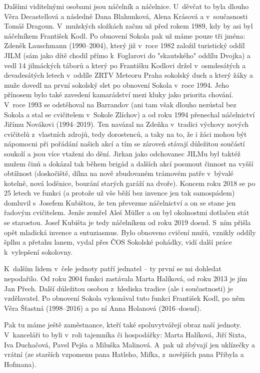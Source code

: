 \documentclass[a5paper, 11pt, twoside]{article}
\begin{document}
{\sloppy Dalšími viditelnými osobami jsou náčelník a náčelnice. U~děvčat to byla dlouho Věra Decastellová a následně Dana Blahunková, Alena Krásová a
v~současnosti Tomáš Dragoun. V~mužských složkách začnu už před rokem 1989,
kdy by asi byl náčelníkem František Kodl. Po obnovení Sokola pak už máme
pouze tři jména: Zdeněk Lauschmann (1990--2004), který již v~roce 1982
založil turistický oddíl JILM (sám jako dítě chodil přímo k~Foglarovi do
"skautského" oddílu Dvojka) a vedl 14 jilmáckých táborů a který po
Františku Kodlovi držel v~osmdesátých a devadesátých letech v~oddíle
ZRTV Meteoru Praha sokolský duch a který žáky a muže dovedl na první
sokolský slet po obnovení Sokola v~roce 1994. Jeho přínosem bylo také
zavedení kamarádství mezi kluky jako priorita chování. V~roce 1993 se
odstěhoval na Barrandov (ani tam však dlouho nezůstal bez Sokola a stal
se cvičitelem v~Sokole Zlíchov) a od roku 1994 přenechal náčelnictví
Jiřímu Novákovi (1994--2019). Ten navázal na Zdeňka
v~tradici výchovy nových cvičitelů z~vlastních zdrojů, tedy dorostenců, a
taky na to, že i žáci mohou být nápomocni při pořádání našich akcí a tím
se zároveň stávají důležitou součástí soukolí a jsou více vtaženi do
dění. Jirkan jako odchovanec JILMu byl taktéž mužem činů a dokázal tak
během brigád a dalších akcí posunout činnost na vyšší obtížnost
(doskočiště, dílna na nově zbudovaném trámovém patře v~bývalé kotelně,
nová loděnice, bourání starých garáží na dvoře). Koncem roku 2018 se po
25 letech ve funkci (a protože už vše běží bez invence jen tak
samospádem) domluvil s~Josefem Kubištou, že ten převezme náčelnictví a
on se stane jen řadovým cvičitelem. Jenže zemřel Aleš Müller a on byl
okolnostmi dotlačen stát se starostou. Josef Kubišta je tedy náčelníkem
od roku 2019 dosud. S~ním přišla opět mladická invence a entuziasmus.
Bylo obnoveno cvičení mužů, vznikly oddíly šplhu a přetahu lanem, vydal
přes ČOS Sokolské pohádky, vidí další práce k~vylepšení sokolovny.\par}

K~dalším lidem v~čele jednoty patří jednatel -- ty první se mi dohledat
nepodařilo. Od roku 2004 funkci zastávala Marta Halíková, od roku 2013
je jím Jan Přech. Další důležitou osobou z~hlediska tradice (ale i
součastnosti) je vzdělavatel. Po obnovení Sokola vykonával tuto funkci
František Kodl, po něm Věra Šťastná (1998--2016) a po ní Anna Holanová
(2016--dosud).

Pak tu máme ještě zaměstnance, kteří také spoluvytvářejí obraz naší
jednoty. V~kanceláři to byli v~roli tajemníka či hospodářky: Marta
Halíková, Jiří Sixta, Iva Duchačová, Pavel Pejša a Miluška Malinová.
A~pak už zbývají jen uklízečky a vrátní (ze starších vzpomenu pana
Hatleho, Mifka, z~novějších pana Přibyla a Hofmana).
\end{document}
